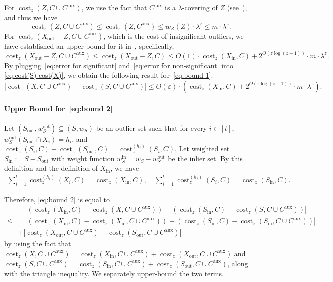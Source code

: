 \documentclass[letterpaper,11pt]{article}
\theoremstyle{plain}
\theoremstyle{definition}
\theoremstyle{remark}
\DeclareMathOperator{\cost}{cost}
\newcommand{\inl}{\mathrm{in}}
\newcommand{\out}{\mathrm{out}}
\newcommand{\eps}{\varepsilon}
\newcommand{\aux}{\mathrm{aux}}
\begin{document}
For $\cost_z(Z,C\cup C^\aux)$, we use the fact that $C^\aux$ is a $\lambda$-covering of $Z$ (see~), and thus we have
\begin{equation}
    \label{eq:error for significant}
    \cost_z(Z,C\cup C^\aux)\le \cost_z(Z,C^\aux)\le w_Z(Z)\cdot \lambda^z\le m\cdot \lambda^z.
\end{equation}
For $\cost_z(X_\out - Z,C\cup C^\aux)$, which is the cost of insignificant outliers, we have established an upper bound for it in~, specifically,
\begin{equation}
    \label{eq:error for non-significant}
    \cost_z(X_\out - Z,C\cup C^\aux)\le \cost_z(X_\out - Z,C)\le O(1)\cdot \cost_z(X_\inl,C) + 2^{O(z\log(z+1))}\cdot m\cdot \lambda^z.
\end{equation}
By plugging~\eqref{eq:error for significant} and~\eqref{eq:error for non-significant} into \eqref{eq:cost(S)-cost(X)}, we obtain the following result for~\eqref{eq:bound 1}.
\begin{equation}
    \label{eq:key 1}
    \left|\cost_z(X,C\cup C^\aux) - \cost_z(S,C\cup C^\aux) \right|\le O(\eps)\cdot \left(\cost_z(X_\inl,C) + 2^{O(z\log(z+1))}\cdot m\cdot \lambda^z\right).
\end{equation}




\paragraph{Upper Bound for~\eqref{eq:bound 2}} 

Let $(S_\out,w_{S}^\out)\subseteq (S,w_S)$ be an outlier set such that for every $i\in [t]$, $w_{S}^\out(S_\out\cap X_i) = h_i$, and $\cost_z(S_i,C) - \cost_z(S_\out,C) = \cost_z^{(h_i)}(S_i,C)$. Let weighted set $S_\inl:=S - S_\out$ with weight function $w_S^\inl = w_S - w_S^\out$ be the inlier set.
By this definition and the definition of $X_\inl$, we have 
\begin{align*}
    \sum_{i=1}^t\cost_z^{(h_i)}(X_i,C)= \cost_z(X_\inl,C),\quad \sum_{i=1}^t\cost_z^{(h_i)}(S_i,C) = \cost_z(S_\inl,C).
\end{align*}

Therefore, \eqref{eq:bound 2} is equal to
\begin{equation}
    \label{eq:Xin vs Sin}
    \begin{aligned}
        &\quad \left|\left(\cost_z(X_\inl,C) - \cost_z(X,C\cup C^\aux) \right) - \left(\cost_z(S_\inl,C) - \cost_z(S,C\cup C^\aux) \right) \right|\\
    \le&\quad \left|\left(\cost_z(X_\inl,C) - \cost_z(X_\inl,C\cup C^\aux) \right) - \left(\cost_z(S_\inl,C) - \cost_z(S_\inl,C\cup C^\aux) \right)  \right|\\
    &+\left|\cost_z(X_\out,C\cup C^\aux) - \cost_z(S_\out,C\cup C^\aux) \right|
    \end{aligned}
\end{equation}
by using the fact that $\cost_z(X,C\cup C^\aux) = \cost_z(X_\inl,C\cup C^\aux) + \cost_z(X_\out,C\cup C^\aux)$ and $\cost_z(S,C\cup C^\aux) = \cost_z(S_\inl,C\cup C^\aux) + \cost_z(S_\out,C\cup C^\aux)$, along with the triangle inequality.
We separately upper-bound the two terms.
\end{document}
